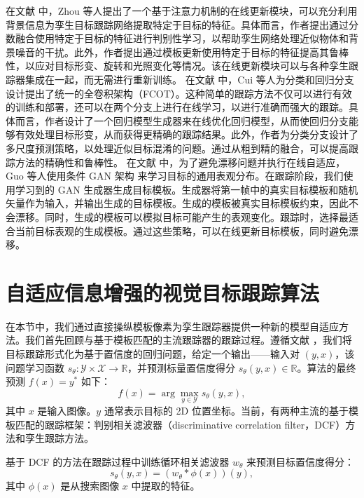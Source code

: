 在文献 \cite{DiscriminativeAnd} 中，Zhou 等人提出了一个基于注意力机制的在线更新模块，可以充分利用背景信息为孪生目标跟踪网络提取特定于目标的特征。具体而言，作者提出通过分数融合使用特定于目标的特征进行判别性学习，以帮助孪生网络处理近似物体和背景噪音的干扰。此外，作者提出通过模板更新使用特定于目标的特征提高其鲁棒性，以应对目标形变、旋转和光照变化等情况。该在线更新模块可以与各种孪生跟踪器集成在一起，而无需进行重新训练。%
在文献 \cite{FCOT} 中，Cui 等人为分类和回归分支设计提出了统一的全卷积架构（FCOT）。这种简单的跟踪方法不仅可以进行有效的训练和部署，还可以在两个分支上进行在线学习，以进行准确而强大的跟踪。具体而言，作者设计了一个回归模型生成器来在线优化回归模型，从而使回归分支能够有效处理目标形变，从而获得更精确的跟踪结果。此外，作者为分类分支设计了多尺度预测策略，以处理近似目标混淆的问题。通过从粗到精的融合，可以提高跟踪方法的精确性和鲁棒性。 %
在文献 \cite{TGGAN} 中，为了避免漂移问题并执行在线自适应，Guo 等人使用条件 GAN 架构 \cite{cGAN} 来学习目标的通用表观分布。在跟踪阶段，我们使用学习到的 GAN 生成器生成目标模板。生成器将第一帧中的真实目标模板和随机矢量作为输入，并输出生成的目标模板。生成的模板被真实目标模板约束，因此不会漂移。同时，生成的模板可以模拟目标可能产生的表观变化。跟踪时，选择最适合当前目标表观的生成模板。通过这些策略，可以在线更新目标模板，同时避免漂移。%

\section{自适应信息增强的视觉目标跟踪算法}
在本节中，我们通过直接操纵模板像素为孪生跟踪器提供一种新的模型自适应方法。我们首先回顾与基于模板匹配的主流跟踪器的跟踪过程。遵循文献 \cite{Danelljan_2020_CVPR}，我们将目标跟踪形式化为基于置信度的回归问题，给定一个输出——输入对 $(y,x)$，该问题学习函数 $s_\theta:\mathcal{Y\times X\rightarrow \mathbb R}$，并预测标量置信度得分 $s_\theta(y,x)\in\mathbb R$。算法的最终预测 $f(x)=y^*$ 如下：
\begin{equation}
    f(x) = \arg\max_{y\in \mathcal Y}s_\theta (y,x),
\end{equation}
其中 $x$ 是输入图像。$y$ 通常表示目标的 2D 位置坐标。当前，有两种主流的基于模板匹配的跟踪框架：判别相关滤波器（discriminative correlation filter，DCF）方法和孪生跟踪方法。

基于 DCF 的方法在跟踪过程中训练循环相关滤波器 $w_{\theta}$ 来预测目标置信度得分：
\begin{equation}
    s_\theta(y,x)=(w_\theta * \phi(x))(y),
    \label{equ:dcf}
\end{equation}
其中 $\phi(x)$ 是从搜索图像 $x$ 中提取的特征。

